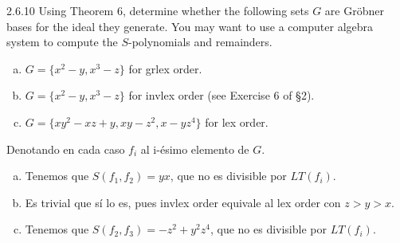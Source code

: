 \documentclass[twoside]{article}
\begin{document}
\begin{ejercicio}{2.6.10}
Using Theorem 6, determine whether the following sets $G$ are Gröbner bases for the
ideal they generate. You may want to use a computer algebra system to compute the
$S$-polynomials and remainders.
\begin{enumerate}[a.]
\item $G = \{x^2 − y, x^3 − z\}$ for grlex order.
\item $G = \{x^2 − y, x^3 − z\}$ for invlex order (see Exercise 6 of §2).
\item $G = \{xy^2 − xz + y, xy − z^2, x − yz^4\}$ for lex order.
\end{enumerate}
\end{ejercicio}
\begin{solucion}
Denotando en cada caso $f_i$ al i-ésimo elemento de $G$.
\begin{enumerate}[a.]
\item Tenemos que $S(f_1,f_2)=yx$, que no es divisible por $LT(f_i)$. 
\item Es trivial que sí lo es, pues invlex order equivale al lex order con $z>y>x$.
\item Tenemos que $S(f_2,f_3)=-z^2+y^2z^4$, que no es divisible por $LT(f_i)$.
\end{enumerate}
\end{solucion}

\newpage
\end{document}
